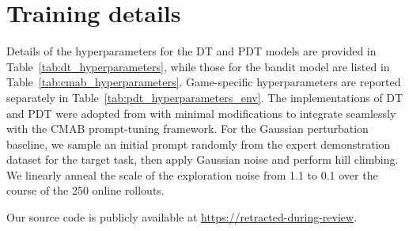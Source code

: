 \documentclass{article} %
\begin{document}
\section{Training details}
\label{appx:training_details}
Details of the hyperparameters for the DT and PDT models are provided in Table~\ref{tab:dt_hyperparameters}, while those for the bandit model are listed in Table~\ref{tab:cmab_hyperparameters}. Game-specific hyperparameters are reported separately in Table~\ref{tab:pdt_hyperparameters_env}. The implementations of DT and PDT were adopted from \citet{minimal_decision_transformer} with minimal modifications to integrate seamlessly with the CMAB prompt-tuning framework.
For the Gaussian perturbation baseline, we sample an initial prompt randomly from the expert demonstration dataset for the target task, then apply Gaussian noise and perform hill climbing. We linearly anneal the scale of the exploration noise from 1.1 to 0.1 over the course of the 250 online rollouts. 

Our source code is publicly available at \url{https://retracted-during-review}.
\end{document}
